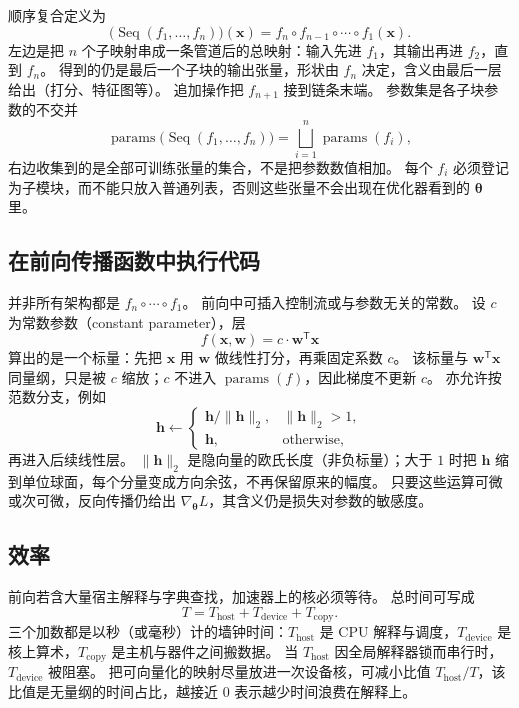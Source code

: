 顺序复合定义为
\[
\bigl(\operatorname{Seq}(f_1,\ldots,f_n)\bigr)(\bm{x})
=
f_n\circ f_{n-1}\circ\cdots\circ f_1(\bm{x}).
\]
左边是把 $n$ 个子映射串成一条管道后的总映射：输入先进 $f_1$，其输出再进 $f_2$，直到 $f_n$。
得到的仍是最后一个子块的输出张量，形状由 $f_n$ 决定，含义由最后一层给出（打分、特征图等）。
追加操作把 $f_{n+1}$ 接到链条末端。
参数集是各子块参数的不交并
\[
\operatorname{params}\bigl(\operatorname{Seq}(f_1,\ldots,f_n)\bigr)
=
\bigsqcup_{i=1}^{n}\operatorname{params}(f_i),
\]
右边收集到的是全部可训练张量的集合，不是把参数数值相加。
每个 $f_i$ 必须登记为子模块，而不能只放入普通列表，否则这些张量不会出现在优化器看到的 $\bm{\theta}$ 里。

\subsection{在前向传播函数中执行代码}

并非所有架构都是 $f_n\circ\cdots\circ f_1$。
前向中可插入控制流或与参数无关的常数。
设 $c$ 为常数参数（constant parameter），层
\[
f(\bm{x},\bm{w})=c\cdot\bm{w}^{\mathsf T}\bm{x}
\]
算出的是一个标量：先把 $\bm{x}$ 用 $\bm{w}$ 做线性打分，再乘固定系数 $c$。
该标量与 $\bm{w}^{\mathsf T}\bm{x}$ 同量纲，只是被 $c$ 缩放；$c$ 不进入 $\operatorname{params}(f)$，因此梯度不更新 $c$。
亦允许按范数分支，例如
\[
\bm{h}
\leftarrow
\begin{cases}
\bm{h}/\|\bm{h}\|_2, & \|\bm{h}\|_2>1,\\
\bm{h}, & \text{otherwise,}
\end{cases}
\]
再进入后续线性层。
$\|\bm{h}\|_2$ 是隐向量的欧氏长度（非负标量）；大于 $1$ 时把 $\bm{h}$ 缩到单位球面，每个分量变成方向余弦，不再保留原来的幅度。
只要这些运算可微或次可微，反向传播仍给出 $\nabla_{\bm{\theta}}L$，其含义仍是损失对参数的敏感度。

\subsection{效率}

前向若含大量宿主解释与字典查找，加速器上的核必须等待。
总时间可写成
\[
T=T_{\mathrm{host}}+T_{\mathrm{device}}+T_{\mathrm{copy}}.
\]
三个加数都是以秒（或毫秒）计的墙钟时间：$T_{\mathrm{host}}$ 是 CPU 解释与调度，$T_{\mathrm{device}}$ 是核上算术，$T_{\mathrm{copy}}$ 是主机与器件之间搬数据。
当 $T_{\mathrm{host}}$ 因全局解释器锁而串行时，$T_{\mathrm{device}}$ 被阻塞。
把可向量化的映射尽量放进一次设备核，可减小比值 $T_{\mathrm{host}}/T$，该比值是无量纲的时间占比，越接近 $0$ 表示越少时间浪费在解释上。

